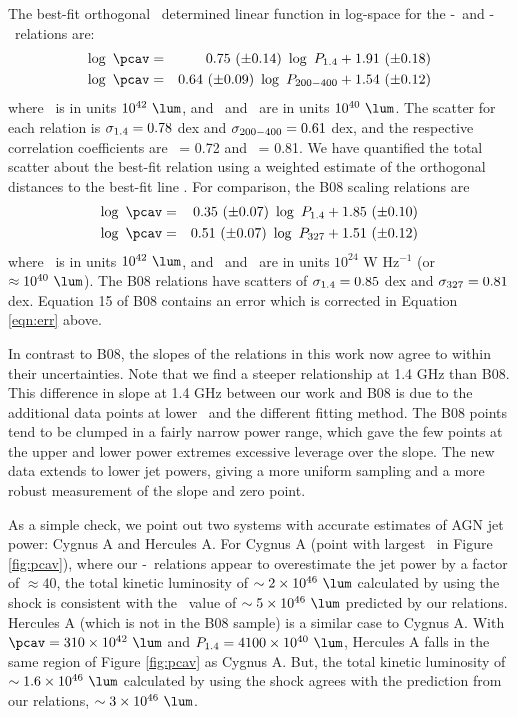 \documentclass{emulateapj}
\begin{document}
The best-fit orthogonal \bces\ determined linear function in log-space
for the \pcav-\phigh\ and \pcav-\plow\ relations are:
\begin{eqnarray}
  \log~\pcav &=& 0.75~(\pm 0.14)~\log~\phigh + 1.91~(\pm 0.18) \label{eqn:high}\\
  \log~\pcav &=& 0.64~(\pm 0.09)~\log~\plow + 1.54~(\pm 0.12) \label{eqn:low}
\end{eqnarray}
where \pcav\ is in units $10^{42} ~\lum$, and \phigh\ and \plow\ are
in units $10^{40} ~\lum$. The scatter for each relation is $\sigma_{\mathrm{1.4}} =
0.78$ dex and $\sigma_{\mathrm{200-400}} = 0.61$ dex, and the respective correlation
coefficients are \rhigh\ = 0.72 and \rlow\ = 0.81. We have quantified
the total scatter about the best-fit relation using a weighted
estimate of the orthogonal distances to the best-fit line
\citep[see][]{2009A&A...498..361P}. For comparison, the B08 scaling
relations are
\begin{eqnarray}
  \log~\pcav &=& 0.35~(\pm 0.07)~\log~\phigh + 1.85~(\pm 0.10) \\
  \log~\pcav &=& 0.51~(\pm 0.07)~\log~\pthree + 1.51~(\pm 0.12) \label{eqn:err}
\end{eqnarray}
where \pcav\ is in units $10^{42} ~\lum$, and \phigh\ and \pthree\ are
in units $10^{24}$ W Hz$^{-1}$ (or $\approx 10^{40} ~\lum$). The B08
relations have scatters of $\sigma_{\mathrm{1.4}} = 0.85$ dex and $\sigma_{\mathrm{327}} = 0.81$
dex. Equation 15 of B08 contains an error \citep{birzan08err} which is
corrected in Equation \ref{eqn:err} above.

In contrast to B08, the slopes of the relations in this work now agree
to within their uncertainties. Note that we find a steeper
relationship at 1.4 GHz than B08. This difference in slope at 1.4 GHz
between our work and B08 is due to the additional data points at lower
\pjet\ and the different fitting method. The B08 points tend to be
clumped in a fairly narrow power range, which gave the few points at
the upper and lower power extremes excessive leverage over the
slope. The new data extends to lower jet powers, giving a more uniform
sampling and a more robust measurement of the slope and zero point.

As a simple check, we point out two systems with accurate estimates of
AGN jet power: Cygnus A and Hercules A. For Cygnus A (point with
largest \phigh\ in Figure \ref{fig:pcav}), where our
\pjet-\prad\ relations appear to overestimate the jet power by a
factor of $\approx 40$, the total kinetic luminosity of $\sim 2 \times
10^{46} ~\lum$ calculated by \citet{2006ApJ...644L...9W} using the
shock is consistent with the \pjet\ value of $\sim 5 \times 10^{46}
~\lum$ predicted by our relations. Hercules A (which is not in the B08
sample) is a similar case to Cygnus A. With $\pcav = 310 \times
10^{42} ~\lum$ and $\phigh = 4100 \times 10^{40} ~\lum$, Hercules A
falls in the same region of Figure \ref{fig:pcav} as Cygnus A. But,
the total kinetic luminosity of $\sim 1.6 \times 10^{46} ~\lum$
calculated by \citet{herca} using the shock agrees with the prediction
from our relations, $\sim 3 \times 10^{46} ~\lum$.
\end{document}
